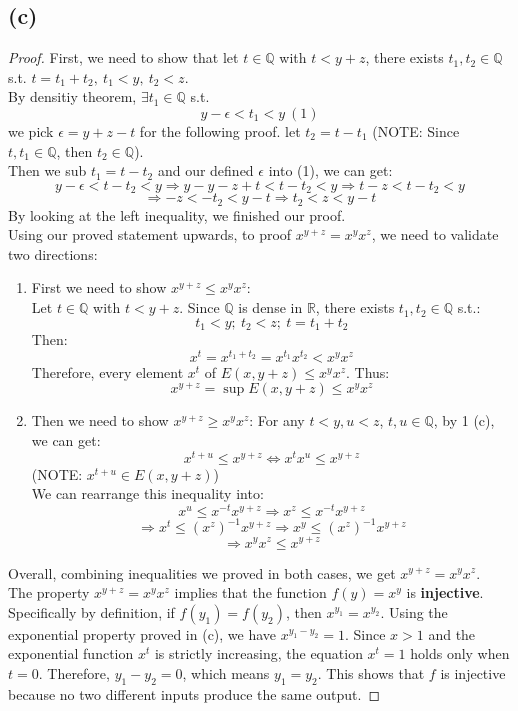 \documentclass{article}
\begin{document}
\subsection*{(c)}
\begin{proof}
    First, we need to show that let $t \in \mathbb{Q}$ with $t < y + z$, there exists $t_1, t_2 \in \mathbb{Q}$ s.t. $t = t_1 + t_2, \ t_1 < y, \ t_2 < z$.
    \\
    By densitiy theorem, $\exists t_1 \in \mathbb{Q}$ s.t.
    \[ y - \epsilon < t_1 < y \ (1) \] 
    we pick $\epsilon = y + z - t$ for the following proof.
    let $t_2 = t - t_1$ (NOTE: Since $t, t_1 \in \mathbb{Q}$, then $t_2 \in \mathbb{Q}$). 
    \\
    Then we sub $t_1 = t - t_2$ and our defined $\epsilon$ into (1), we can get:
    \[ y - \epsilon < t - t_2 < y \Rightarrow y - y - z + t < t - t_2 < y \Rightarrow t - z < t - t_2 < y \]
    \[ \Rightarrow -z < -t_2 < y - t \Rightarrow t_2 < z < y - t \]
    By looking at the left inequality, we finished our proof.
    \\
    Using our proved statement upwards, to proof $x^{y + z} = x^y x^z$, we need to validate two directions:
    \\
    \begin{enumerate}
        \item First we need to show $x^{y + z} \leq x^y x^z$:
        \\
        Let $t \in \mathbb{Q}$ with $t < y + z$.
        Since $\mathbb{Q}$ is dense in $\mathbb{R}$, there exists $t_1, t_2 \in \mathbb{Q}$ s.t.:
        \[ t_1 < y; \ t_2 < z; \ t = t_1 + t_2 \]
        Then:
        \[ x^t = x^{t_1 + t_2} = x^{t_1}x^{t_2} < x^yx^z \]
        Therefore, every element $x^t$ of $E(x, y + z) \leq x^yx^z$.
        Thus:
        \[ x^{y + z} = \sup E(x, y + z) \leq x^y x^z \]
        \item Then we need to show $x^{y + z} \geq x^y x^z$:
        For any $t < y, u < z$, $t,u \in \mathbb{Q}$, by 1 (c), we can get:
        \[ x^{t + u} \leq x^{y + z} \Leftrightarrow x^t x^u \leq x^{y + z} \]
        (NOTE: $x^{t + u} \in E(x, y + z)$)
        \\
        We can rearrange this inequality into:
        \[ x^u \leq x^{-t} x^{y + z} \Rightarrow x^z \leq x^{-t} x^{y + z} \]
        \[ \Rightarrow x^{t} \leq (x^{z})^{-1} x^{y + z} \Rightarrow x^{y} \leq (x^{z})^{-1} x^{y + z} \]
        \[ \Rightarrow x^{y}x^{z} \leq x^{y + z} \]
    \end{enumerate}
    Overall, combining inequalities we proved in both cases, we get $x^{y + z} = x^y x^z$.
    \\
    The property \( x^{y+z} = x^y x^z \) implies that the function \( f(y) = x^y \) is \textbf{injective}.
    Specifically by definition, if \( f(y_1) = f(y_2) \), then \( x^{y_1} = x^{y_2} \). Using the exponential property proved in (c), we have \( x^{y_1 - y_2} = 1 \). Since \( x > 1 \) and the exponential function \( x^t \) is strictly increasing, the equation \( x^t = 1 \) holds only when \( t = 0 \). Therefore, \( y_1 - y_2 = 0 \), which means \( y_1 = y_2 \). 
    This shows that \( f \) is injective because no two different inputs produce the same output.
\end{proof}
\end{document}

